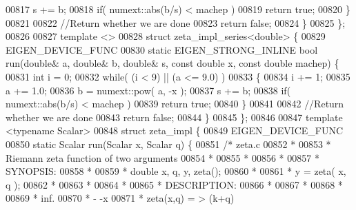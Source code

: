 \begin{DoxyCode}
00817         s += b;
00818         \textcolor{keywordflow}{if}( numext::abs(b/s) < machep )
00819             \textcolor{keywordflow}{return} \textcolor{keyword}{true};
00820     \}
00821 
00822     \textcolor{comment}{//Return whether we are done}
00823     \textcolor{keywordflow}{return} \textcolor{keyword}{false};
00824   \}
00825 \};
00826 
00827 \textcolor{keyword}{template} <>
00828 \textcolor{keyword}{struct }zeta\_impl\_series<double> \{
00829   EIGEN\_DEVICE\_FUNC
00830   \textcolor{keyword}{static} EIGEN\_STRONG\_INLINE \textcolor{keywordtype}{bool} run(\textcolor{keywordtype}{double}& a, \textcolor{keywordtype}{double}& b, \textcolor{keywordtype}{double}& s, \textcolor{keyword}{const} \textcolor{keywordtype}{double} x, \textcolor{keyword}{const} \textcolor{keywordtype}{double} machep)
       \{
00831     \textcolor{keywordtype}{int} i = 0;
00832     \textcolor{keywordflow}{while}( (i < 9) || (a <= 9.0) )
00833     \{
00834         i += 1;
00835         a += 1.0;
00836         b = numext::pow( a, -x );
00837         s += b;
00838         \textcolor{keywordflow}{if}( numext::abs(b/s) < machep )
00839             \textcolor{keywordflow}{return} \textcolor{keyword}{true};
00840     \}
00841 
00842     \textcolor{comment}{//Return whether we are done}
00843     \textcolor{keywordflow}{return} \textcolor{keyword}{false};
00844   \}
00845 \};
00846 
00847 \textcolor{keyword}{template} <\textcolor{keyword}{typename} Scalar>
00848 \textcolor{keyword}{struct }zeta\_impl \{
00849     EIGEN\_DEVICE\_FUNC
00850     \textcolor{keyword}{static} Scalar run(Scalar x, Scalar q) \{
00851         \textcolor{comment}{/*                          zeta.c}
00852 \textcolor{comment}{         *}
00853 \textcolor{comment}{         *  Riemann zeta function of two arguments}
00854 \textcolor{comment}{         *}
00855 \textcolor{comment}{         *}
00856 \textcolor{comment}{         *}
00857 \textcolor{comment}{         * SYNOPSIS:}
00858 \textcolor{comment}{         *}
00859 \textcolor{comment}{         * double x, q, y, zeta();}
00860 \textcolor{comment}{         *}
00861 \textcolor{comment}{         * y = zeta( x, q );}
00862 \textcolor{comment}{         *}
00863 \textcolor{comment}{         *}
00864 \textcolor{comment}{         *}
00865 \textcolor{comment}{         * DESCRIPTION:}
00866 \textcolor{comment}{         *}
00867 \textcolor{comment}{         *}
00868 \textcolor{comment}{         *}
00869 \textcolor{comment}{         *                 inf.}
00870 \textcolor{comment}{         *                  -        -x}
00871 \textcolor{comment}{         *   zeta(x,q)  =   >   (k+q)}

\end{DoxyCode}

